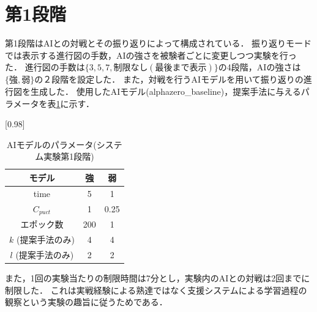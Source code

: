 \section{第1段階}
第1段階はAIとの対戦とその振り返りによって構成されている．
振り返りモードでは表示する進行図の手数，AIの強さを被験者ごとに変更しつつ実験を行った．
進行図の手数は$\{3, 5, 7, 制限なし(最後まで表示)\}$の4段階，AIの強さは$\{強,弱\}$の２段階を設定した．
また，対戦を行うAIモデルを用いて振り返りの進行図を生成した．
使用したAIモデル(alphazero\_baseline)，提案手法に与えるパラメータを表\ref{table:param-system}に示す．
\begin{table}[H]
	\caption{AIモデルのパラメータ(システム実験第1段階)}
    \label{table:param-system}
	\centering
	\scalebox{0.98}[0.98]{
		\begin{tabular}{c|c|c}
			モデル&強&弱\\\hline
			time    & 5 & 1 \\ 
			$C_{puct}$ & 1   & 0.25 \\
            エポック数 & 200 & 1 \\
			$k$ (提案手法のみ)     & 4 & 4 \\
			$l$ (提案手法のみ)     & 2 & 2 \\

		\end{tabular}
	}
	
\end{table}
また，1回の実験当たりの制限時間は7分とし，実験内のAIとの対戦は2回までに制限した．
これは実戦経験による熟達ではなく支援システムによる学習過程の観察という実験の趣旨に従うためである．

